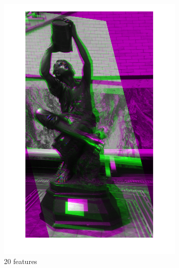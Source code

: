 \documentclass{article}
\begin{document}
\begin{figure}[h]
	\centering
	\begin{subfigure}[b]{0.3\textwidth}
		\centering
		\includegraphics[width=\textwidth]{figures/alignment/fused_20_features_16_iterations}
		\caption{20 features}
	\end{subfigure}
	\begin{subfigure}[b]{0.3\textwidth}
		\centering

\end{subfigure}
\end{figure}
\end{document}
